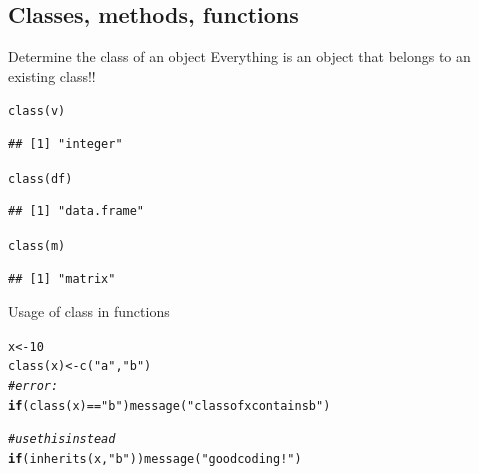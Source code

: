 \documentclass[xcolor=table,       handout,    xcolor=dvipsnames]{beamer}\usepackage[]{graphicx}\usepackage[]{color}
\makeatletter
\newcommand{\hlnum}[1]{\textcolor[rgb]{0,0,0}{#1}}
\newcommand{\hlstr}[1]{\textcolor[rgb]{0.545,0.137,0.137}{#1}}
\newcommand{\hlcom}[1]{\textcolor[rgb]{0,0.392,0}{\textit{#1}}}
\newcommand{\hlopt}[1]{\textcolor[rgb]{0,0,0}{#1}}
\newcommand{\hlstd}[1]{\textcolor[rgb]{0,0,0}{#1}}
\newcommand{\hlkwa}[1]{\textcolor[rgb]{1,0,0}{\textbf{#1}}}
\newcommand{\hlkwb}[1]{\textcolor[rgb]{0,0,0}{#1}}
\newcommand{\hlkwd}[1]{\textcolor[rgb]{0,0,1}{#1}}
\newenvironment{kframe}{%
 \def\at@end@of@kframe{}%
 \ifinner\ifhmode%
  \def\at@end@of@kframe{\end{minipage}}%
  \begin{minipage}{\columnwidth}%
 \fi\fi%
 \def\FrameCommand##1{\hskip\@totalleftmargin \hskip-\fboxsep
 \colorbox{shadecolor}{##1}\hskip-\fboxsep
     \hskip-\linewidth \hskip-\@totalleftmargin \hskip\columnwidth}%
 \MakeFramed {\advance\hsize-\width
   \@totalleftmargin\z@ \linewidth\hsize
   \@setminipage}}%
 {\par\unskip\endMakeFramed%
 \at@end@of@kframe}
\newenvironment{knitrout}{}{} %
\makeatother
\begin{document}
\subsection{Classes, methods, functions}

\begin{frame}[fragile]{Determine the class of an object}
	Everything is an object that belongs to an existing class!!
\begin{knitrout}
\color{fgcolor}\begin{kframe}
\begin{alltt}
\hlkwd{class}\hlstd{(v)}
\end{alltt}
\begin{verbatim}
## [1] "integer"
\end{verbatim}
\begin{alltt}
\hlkwd{class}\hlstd{(df)}
\end{alltt}
\begin{verbatim}
## [1] "data.frame"
\end{verbatim}
\begin{alltt}
\hlkwd{class}\hlstd{(m)}
\end{alltt}
\begin{verbatim}
## [1] "matrix"
\end{verbatim}
\end{kframe}
\end{knitrout}
\end{frame}


\begin{frame}[fragile]{Usage of class in functions}
\begin{knitrout}
\color{fgcolor}\begin{kframe}
\begin{alltt}
\hlstd{x} \hlkwb{<-} \hlnum{10}
\hlkwd{class}\hlstd{(x)} \hlkwb{<-} \hlkwd{c}\hlstd{(}\hlstr{"a"}\hlstd{,} \hlstr{"b"}\hlstd{)}
\hlcom{# error:}
\hlkwa{if}\hlstd{(} \hlkwd{class}\hlstd{(x)} \hlopt{==} \hlstr{"b"}   \hlstd{)} \hlkwd{message}\hlstd{(}\hlstr{"class of x contains b"}\hlstd{)}
\end{alltt}


{\ttfamily\noindent{}}\begin{alltt}
\hlcom{# use this instead}
\hlkwa{if}\hlstd{(} \hlkwd{inherits}\hlstd{(x,} \hlstr{"b"}\hlstd{)  )} \hlkwd{message}\hlstd{(}\hlstr{"good coding!"}\hlstd{)}
\end{alltt}


{\ttfamily\noindent\itshape\color{messagecolor}{\#\# good coding!}}\end{kframe}
\end{knitrout}
\end{frame}
\end{document}
